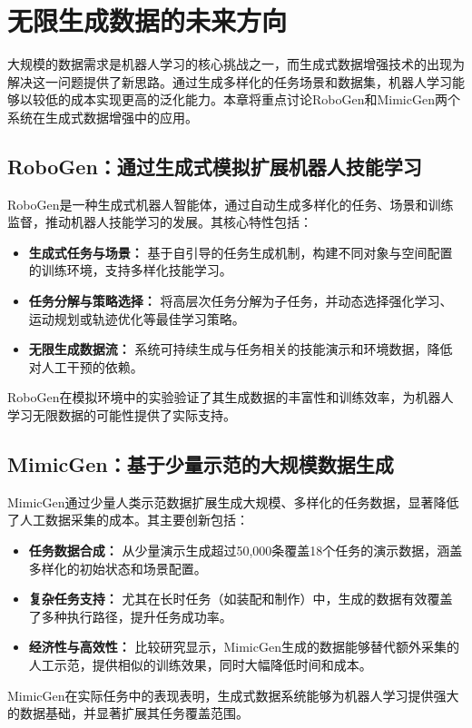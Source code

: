 \documentclass[a4paper]{article}
\begin{document}
\section{无限生成数据的未来方向}

大规模的数据需求是机器人学习的核心挑战之一，而生成式数据增强技术的出现为解决这一问题提供了新思路。通过生成多样化的任务场景和数据集，机器人学习能够以较低的成本实现更高的泛化能力。本章将重点讨论RoboGen和MimicGen两个系统在生成式数据增强中的应用。

\subsection{RoboGen：通过生成式模拟扩展机器人技能学习}
RoboGen是一种生成式机器人智能体，通过自动生成多样化的任务、场景和训练监督，推动机器人技能学习的发展\cite{wang2023robogen}。其核心特性包括：
\begin{itemize}
    \item \textbf{生成式任务与场景：} 基于自引导的任务生成机制，构建不同对象与空间配置的训练环境，支持多样化技能学习。
    \item \textbf{任务分解与策略选择：} 将高层次任务分解为子任务，并动态选择强化学习、运动规划或轨迹优化等最佳学习策略。
    \item \textbf{无限生成数据流：} 系统可持续生成与任务相关的技能演示和环境数据，降低对人工干预的依赖。
\end{itemize}
RoboGen在模拟环境中的实验验证了其生成数据的丰富性和训练效率，为机器人学习无限数据的可能性提供了实际支持。

\subsection{MimicGen：基于少量示范的大规模数据生成}
MimicGen通过少量人类示范数据扩展生成大规模、多样化的任务数据，显著降低了人工数据采集的成本\cite{mandlekar2023mimicgen}。其主要创新包括：
\begin{itemize}
    \item \textbf{任务数据合成：} 从少量演示生成超过50,000条覆盖18个任务的演示数据，涵盖多样化的初始状态和场景配置。
    \item \textbf{复杂任务支持：} 尤其在长时任务（如装配和制作）中，生成的数据有效覆盖了多种执行路径，提升任务成功率。
    \item \textbf{经济性与高效性：} 比较研究显示，MimicGen生成的数据能够替代额外采集的人工示范，提供相似的训练效果，同时大幅降低时间和成本。
\end{itemize}
MimicGen在实际任务中的表现表明，生成式数据系统能够为机器人学习提供强大的数据基础，并显著扩展其任务覆盖范围。
\end{document}

